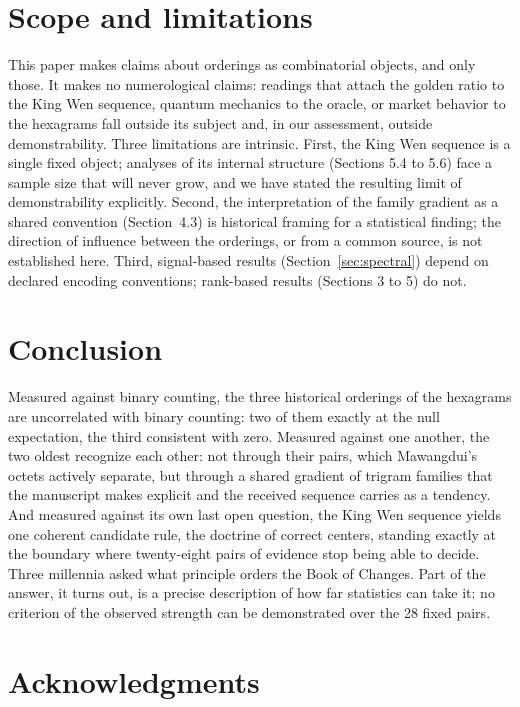 \documentclass[11pt]{article}
\begin{document}
\section{Scope and limitations}

This paper makes claims about orderings as combinatorial objects, and only those. It makes no numerological claims: readings that attach the golden ratio to the King Wen sequence, quantum mechanics to the oracle, or market behavior to the hexagrams fall outside its subject and, in our assessment, outside demonstrability. Three limitations are intrinsic. First, the King Wen sequence is a single fixed object; analyses of its internal structure (Sections 5.4 to 5.6) face a sample size that will never grow, and we have stated the resulting limit of demonstrability explicitly. Second, the interpretation of the family gradient as a shared convention (Section~4.3) is historical framing for a statistical finding; the direction of influence between the orderings, or from a common source, is not established here. Third, signal-based results (Section~\ref{sec:spectral}) depend on declared encoding conventions; rank-based results (Sections 3 to 5) do not.

\section{Conclusion}

Measured against binary counting, the three historical orderings of the hexagrams are uncorrelated with binary counting: two of them exactly at the null expectation, the third consistent with zero. Measured against one another, the two oldest recognize each other: not through their pairs, which Mawangdui's octets actively separate, but through a shared gradient of trigram families that the manuscript makes explicit and the received sequence carries as a tendency. And measured against its own last open question, the King Wen sequence yields one coherent candidate rule, the doctrine of correct centers, standing exactly at the boundary where twenty-eight pairs of evidence stop being able to decide. Three millennia asked what principle orders the Book of Changes. Part of the answer, it turns out, is a precise description of how far statistics can take it: no criterion of the observed strength can be demonstrated over the 28 fixed pairs.

\section*{Acknowledgments}
\end{document}
